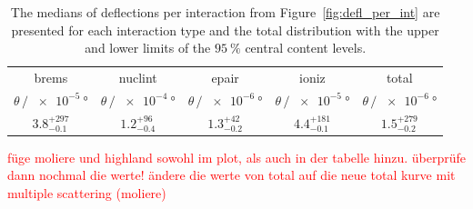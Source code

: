 \begin{table}
    \centering 
    \caption{The medians of deflections per interaction from Figure~\ref{fig:defl_per_int} are presented for each interaction type and the total distribution with the upper and lower limits of the $\SI{95}{\percent}$ 
    central content levels.}
    \begin{tabular}{ccccc}
        \toprule 
        brems & nuclint & epair & ioniz & total \\
        $\theta\,/\,\SI{e-5}{\degree}$ & $\theta\,/\,\SI{e-4}{\degree}$ & $\theta\,/\,\SI{e-6}{\degree}$ & $\theta\,/\,\SI{e-5}{\degree}$ & $\theta\,/\,\SI{e-6}{\degree}$\\
        \midrule 
        $3.8_{-0.1}^{+297}$ & $1.2_{-0.4}^{+96}$ & $1.3_{-0.2}^{+42}$ & $4.4_{-0.1}^{+181}$& $1.5_{-0.2}^{+279}$\\ 
        \bottomrule
    \end{tabular}
    \label{tab:defl_per_int}
\end{table}
\textcolor{red}{füge moliere und highland sowohl im plot, als auch in der tabelle hinzu. überprüfe dann nochmal die werte! ändere die werte von total auf die neue total kurve mit multiple scattering (moliere)}